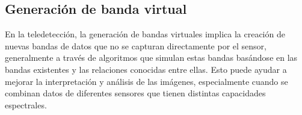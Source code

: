             \subsection{Generación de banda virtual}
                En la teledetección, la generación de bandas virtuales implica la creación de nuevas bandas de datos que no se capturan directamente por el sensor, generalmente a través de algoritmos que simulan estas bandas basándose en las bandas existentes y las relaciones conocidas entre ellas. Esto puede ayudar a mejorar la interpretación y análisis de las imágenes, especialmente cuando se combinan datos de diferentes sensores que tienen distintas capacidades espectrales.